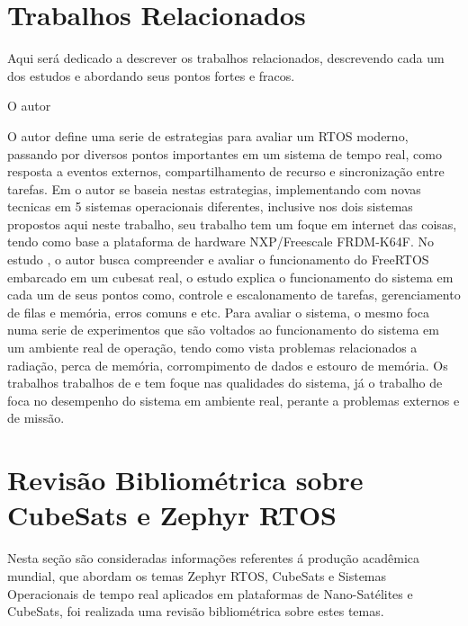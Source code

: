 

\chapter{Trabalhos Relacionados}\label{referencial_teorico}
Aqui será dedicado a descrever os trabalhos relacionados, descrevendo cada um dos estudos 
e abordando seus pontos fortes e fracos. 

O autor \cite{International_Conference__Zhuang} \cite{particle_swarm__Narkhede}\cite{Statistical_approach__Elnahrawy}


O autor \cite{Garcia} define uma serie de estrategias 
para avaliar um RTOS moderno, passando por diversos pontos importantes em um sistema de tempo real, 
como resposta a eventos externos, compartilhamento de recurso e sincronização entre tarefas. 
Em \cite{Raymundo} o autor se baseia nestas estrategias, 
implementando com novas tecnicas em 5 sistemas operacionais diferentes, inclusive nos dois 
sistemas propostos aqui neste trabalho, seu trabalho tem um foque em internet das coisas, 
tendo como base a plataforma de hardware NXP/Freescale FRDM-K64F.
No estudo \cite{nicolas2019avaliaccao}, o autor busca compreender e avaliar o funcionamento 
do FreeRTOS embarcado em um cubesat real, o estudo explica o funcionamento do sistema em 
cada um de seus pontos como, controle e escalonamento de tarefas, gerenciamento de filas e 
memória, erros comuns e etc. Para avaliar o sistema, o mesmo foca numa serie de experimentos 
que são voltados ao funcionamento do sistema em um ambiente real de operação, tendo como vista 
problemas relacionados a radiação, perca de memória, corrompimento de dados e estouro de memória.
Os trabalhos trabalhos de \cite{Garcia} e \cite{Raymundo} tem foque nas qualidades do sistema, já 
o trabalho de \cite{nicolas2019avaliaccao} foca no desempenho do sistema em ambiente real, perante 
a problemas externos e de missão.


\chapter{Revisão Bibliométrica sobre CubeSats e Zephyr RTOS}\label{referencial_teorico}

Nesta seção são consideradas informações referentes á produção acadêmica mundial, que 
abordam os temas Zephyr RTOS, CubeSats e Sistemas Operacionais de tempo real aplicados 
em plataformas de Nano-Satélites e CubeSats, foi realizada uma revisão bibliométrica 
sobre estes temas. 


